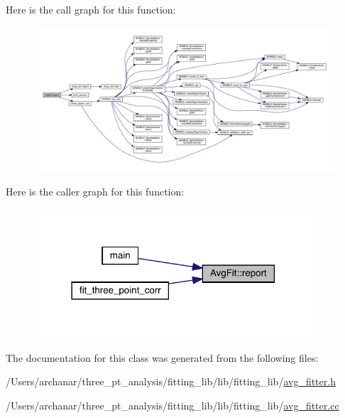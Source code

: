 Here is the call graph for this function\+:
\nopagebreak
\begin{figure}[H]
\begin{center}
\leavevmode
\includegraphics[width=350pt]{d4/dfd/classAvgFit_a78ac6ba410c7f44b543e3b7202e046ca_cgraph}
\end{center}
\end{figure}
Here is the caller graph for this function\+:
\nopagebreak
\begin{figure}[H]
\begin{center}
\leavevmode
\includegraphics[width=294pt]{d4/dfd/classAvgFit_a78ac6ba410c7f44b543e3b7202e046ca_icgraph}
\end{center}
\end{figure}


The documentation for this class was generated from the following files\+:\begin{DoxyCompactItemize}
\item 
/\+Users/archanar/three\+\_\+pt\+\_\+analysis/fitting\+\_\+lib/lib/fitting\+\_\+lib/\mbox{\hyperlink{lib_2fitting__lib_2avg__fitter_8h}{avg\+\_\+fitter.\+h}}\item 
/\+Users/archanar/three\+\_\+pt\+\_\+analysis/fitting\+\_\+lib/lib/fitting\+\_\+lib/\mbox{\hyperlink{avg__fitter_8cc}{avg\+\_\+fitter.\+cc}}\end{DoxyCompactItemize}
